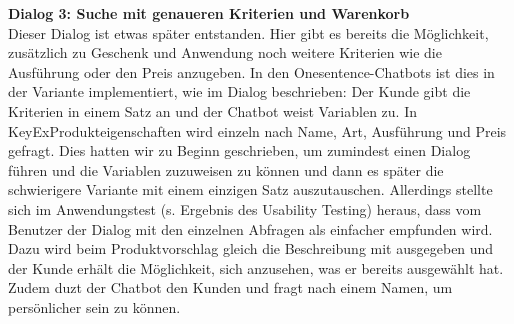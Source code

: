 \Large\textbf{Dialog 3: Suche mit genaueren Kriterien und Warenkorb}\\
\normalsize
Dieser Dialog ist etwas später entstanden. Hier gibt es bereits die Möglichkeit, zusätzlich zu Geschenk und Anwendung noch weitere Kriterien wie die Ausführung oder den Preis anzugeben. In den Onesentence-Chatbots ist dies in der Variante implementiert, wie im Dialog beschrieben: Der Kunde gibt die Kriterien in einem Satz an und der Chatbot weist Variablen zu. In KeyExProdukteigenschaften wird einzeln nach Name, Art, Ausführung und Preis gefragt. Dies hatten wir zu Beginn geschrieben, um zumindest einen Dialog führen und die Variablen zuzuweisen zu können und dann es später die schwierigere Variante mit einem einzigen Satz auszutauschen. Allerdings stellte sich im Anwendungstest (s. Ergebnis des Usability Testing) heraus, dass vom Benutzer der Dialog mit den einzelnen Abfragen als einfacher empfunden wird.\\
Dazu wird beim Produktvorschlag gleich die Beschreibung mit ausgegeben und der Kunde erhält die Möglichkeit, sich anzusehen, was er bereits ausgewählt hat.\\
Zudem duzt der Chatbot den Kunden und fragt nach einem Namen, um persönlicher sein zu können.
\vspace{8pt}
